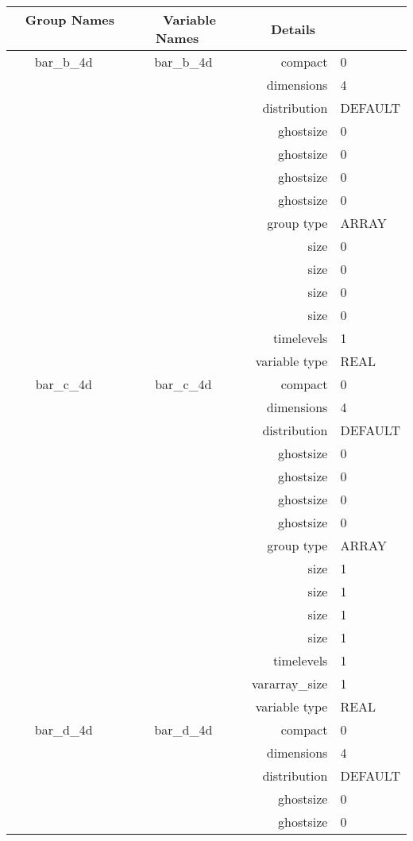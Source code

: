 \vspace{5mm}
\vspace{5mm}

\begin{tabular*}{150mm}{|c|c@{\extracolsep{\fill}}|rl|} \hline 
~ {\bf Group Names} ~ & ~ {\bf Variable Names} ~  &{\bf Details} ~ & ~ \\ 
\hline 
bar\_b\_4d & bar\_b\_4d & compact & 0 \\ 
 &  & dimensions & 4 \\ 
 &  & distribution & DEFAULT \\ 
 &  & ghostsize & 0 \\ 
& ~ & ghostsize & 0 \\ 
 &  & ghostsize & 0 \\ 
 &  & ghostsize & 0 \\ 
 &  & group type & ARRAY \\ 
 &  & size & 0 \\ 
& ~ & size & 0 \\ 
 &  & size & 0 \\ 
 &  & size & 0 \\ 
 &  & timelevels & 1 \\ 
 &  & variable type & REAL \\ 
\hline 
bar\_c\_4d & bar\_c\_4d & compact & 0 \\ 
 &  & dimensions & 4 \\ 
 &  & distribution & DEFAULT \\ 
 &  & ghostsize & 0 \\ 
& ~ & ghostsize & 0 \\ 
 &  & ghostsize & 0 \\ 
 &  & ghostsize & 0 \\ 
 &  & group type & ARRAY \\ 
 &  & size & 1 \\ 
& ~ & size & 1 \\ 
 &  & size & 1 \\ 
 &  & size & 1 \\ 
 &  & timelevels & 1 \\ 
 &  & vararray\_size & 1 \\ 
 &  & variable type & REAL \\ 
\hline 
bar\_d\_4d & bar\_d\_4d & compact & 0 \\ 
 &  & dimensions & 4 \\ 
 &  & distribution & DEFAULT \\ 
 &  & ghostsize & 0 \\ 
& ~ & ghostsize & 0 \\ 

\end{tabular*}
